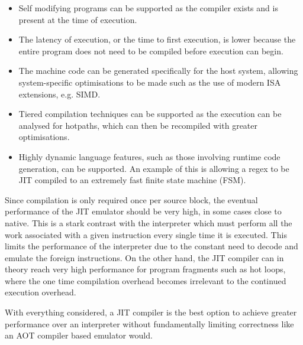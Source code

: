 \begin{itemize}
	\item Self modifying programs can be supported as the compiler exists and is present at the time of execution.
	
	\item The latency of execution, or the time to first execution, is lower because the entire program does not need to be compiled before execution can begin.
	
	\item The machine code can be generated specifically for the host system, allowing system-specific optimisations to be made such as the use of modern ISA extensions, e.g. SIMD.
	
	\item Tiered compilation techniques can be supported as the execution can be analysed for hotpaths, which can then be recompiled with greater optimisations.
	
	\item Highly dynamic language features, such as those involving runtime code generation, can be supported. An example of this is allowing a regex to be JIT compiled to an extremely fast finite state machine (FSM).
\end{itemize}

Since compilation is only required once per source block, the eventual performance of the JIT emulator should be very high, in some cases close to native. This is a stark contrast with the interpreter which must perform all the work associated with a given instruction every single time it is executed. This limits the performance of the interpreter due to the constant need to decode and emulate the foreign instructions. On the other hand, the JIT compiler can in theory reach very high performance for program fragments such as hot loops, where the one time compilation overhead becomes irrelevant to the continued execution overhead.

With everything considered, a JIT compiler is the best option to achieve greater performance over an interpreter without fundamentally limiting correctness like an AOT compiler based emulator would.
